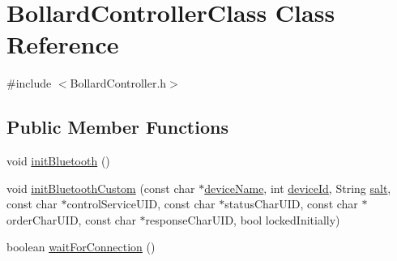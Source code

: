 \hypertarget{class_bollard_controller_class}{}\section{Bollard\+Controller\+Class Class Reference}
\label{class_bollard_controller_class}


{\ttfamily \#include $<$Bollard\+Controller.\+h$>$}

\subsection*{Public Member Functions}
\begin{DoxyCompactItemize}
\item 
void \mbox{\hyperlink{class_bollard_controller_class_a09862f010e4d0e0ffbd107e2041079d1}{init\+Bluetooth}} ()
\item 
void \mbox{\hyperlink{class_bollard_controller_class_aea92c19b0ccb06e2ddc3adadbe698ebf}{init\+Bluetooth\+Custom}} (const char $\ast$\mbox{\hyperlink{class_bollard_controller_class_a957641f4012a1089512b61792d661fb6}{device\+Name}}, int \mbox{\hyperlink{class_bollard_controller_class_a2ee4843a75dc2efa26044c0b80c669e2}{device\+Id}}, String \mbox{\hyperlink{class_bollard_controller_class_a00641ae780ce3476dbd3ed2c2c4f097a}{salt}}, const char $\ast$control\+Service\+U\+ID, const char $\ast$status\+Char\+U\+ID, const char $\ast$order\+Char\+U\+ID, const char $\ast$response\+Char\+U\+ID, bool locked\+Initially)
\item 
boolean \mbox{\hyperlink{class_bollard_controller_class_a6bc962c69934d16bab48b2407ef6f94a}{wait\+For\+Connection}} ()
\end{DoxyCompactItemize}
